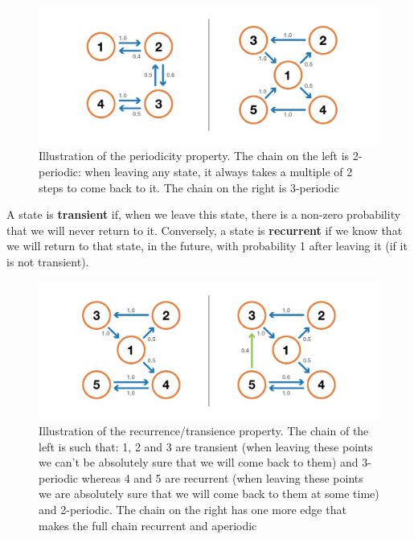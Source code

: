 \begin{figure}[h]
    \centering
\includegraphics[width=\textwidth]{pic/p05c06-snip06.png}
    \caption[Illustration of the periodicity property]{Illustration of the periodicity property. The chain on the left is 2-periodic: when leaving any state, it always takes a multiple of 2 steps to come back to it. The chain on the right is 3-periodic}
    \label{fig:p05c06-snip06}
\end{figure}

A state is \textbf{transient} if, when we leave this state, there is a non-zero probability that we will never return to it. Conversely, a state is \textbf{recurrent} if we know that we will return to that state, in the future, with probability 1 after leaving it (if it is not transient).



\begin{figure}[h]
    \centering
\includegraphics[width=\textwidth]{pic/p05c06-snip07.png}
    \caption[Illustration of the recurrence/transience property.]{Illustration of the recurrence/transience property. The chain of the left is such that: 1, 2 and 3 are transient (when leaving these points we can't be absolutely sure that we will come back to them) and 3-periodic whereas 4 and 5 are recurrent (when leaving these points we are absolutely sure that we will come back to them at some time) and 2-periodic. The chain on the right has one more edge that makes the full chain recurrent and aperiodic}
    \label{fig:p05c06-snip07}
\end{figure}

